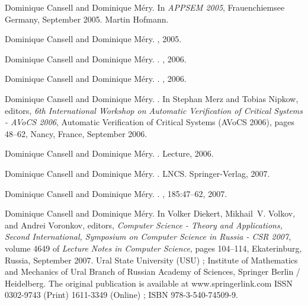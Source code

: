 \documentclass[ 12pt]{article}
\begin{document}
\begin{thebibliography}{100}
Dominique Cansell and Dominique M{\'e}ry.
\newblock In {\em {APPSEM 2005}}, Frauenchiemsee Germany, September 2005.
  {Martin Hofmann}.

Dominique Cansell and Dominique M{\'e}ry.
, 2005.

Dominique Cansell and Dominique M{\'e}ry.
.
, 2006.

Dominique Cansell and Dominique M{\'e}ry.
.
, 2006.

Dominique Cansell and Dominique M{\'e}ry.
.
\newblock In Stephan Merz and Tobias Nipkow, editors, {\em {6th International
  Workshop on Automatic Verification of Critical Systems - AVoCS 2006}},
  Automatic Verification of Critical Systems (AVoCS 2006), pages 48--62, Nancy,
  France, September 2006.

Dominique Cansell and Dominique M{\'e}ry.
.
\newblock Lecture, 2006.

Dominique Cansell and Dominique M{\'e}ry.
.
\newblock LNCS. {Springer-Verlag}, 2007.

Dominique Cansell and Dominique M{\'e}ry.
.
, 185:47--62,
  2007.

Dominique Cansell and Dominique M{\'e}ry.
\newblock In Volker Diekert, Mikhail~V. Volkov, and Andrei Voronkov, editors,
  {\em {Computer Science - Theory and Applications, Second International,
  Symposium on Computer Science in Russia - CSR 2007}}, volume 4649 of {\em
  Lecture Notes in Computer Science}, pages 104--114, Ekaterinburg, Russia,
  September 2007. {Ural State University (USU) ; Institute of Mathematics and
  Mechanics of Ural Branch of Russian Academy of Sciences}, {Springer Berlin /
  Heidelberg}.
\newblock The original publication is available at www.springerlink.com ISSN
  0302-9743 (Print) 1611-3349 (Online) ; ISBN 978-3-540-74509-9.


\end{thebibliography}
\end{document}
